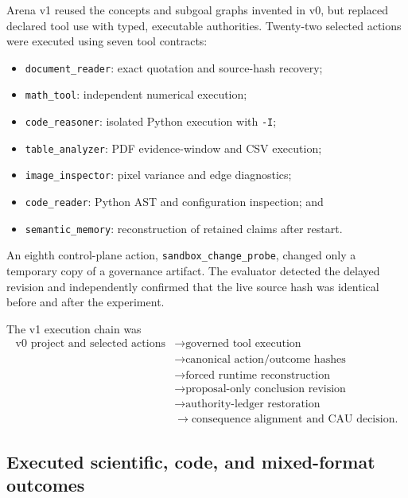 Arena v1 reused the concepts and subgoal graphs invented in v0, but replaced
declared tool use with typed, executable authorities.  Twenty-two selected
actions were executed using seven tool contracts:
\begin{itemize}
  \item \texttt{document\_reader}: exact quotation and source-hash recovery;
  \item \texttt{math\_tool}: independent numerical execution;
  \item \texttt{code\_reasoner}: isolated Python execution with
        \texttt{-I};
  \item \texttt{table\_analyzer}: PDF evidence-window and CSV execution;
  \item \texttt{image\_inspector}: pixel variance and edge diagnostics;
  \item \texttt{code\_reader}: Python AST and configuration inspection; and
  \item \texttt{semantic\_memory}: reconstruction of retained claims after
        restart.
\end{itemize}

An eighth control-plane action, \texttt{sandbox\_change\_probe}, changed only a
temporary copy of a governance artifact.  The evaluator detected the delayed
revision and independently confirmed that the live source hash was identical
before and after the experiment.

The v1 execution chain was
\begin{equation}
\begin{split}
\text{v0 project and selected actions}
&\rightarrow \text{governed tool execution} \\
&\rightarrow \text{canonical action/outcome hashes} \\
&\rightarrow \text{forced runtime reconstruction} \\
&\rightarrow \text{proposal-only conclusion revision} \\
&\rightarrow \text{authority-ledger restoration} \\
&\rightarrow \text{consequence alignment and CAU decision}.
\end{split}
\label{eq:arena-v1-execution-chain}
\end{equation}


\subsection{Executed scientific, code, and mixed-format outcomes}
\label{subsec:arena-v1-outcomes}

